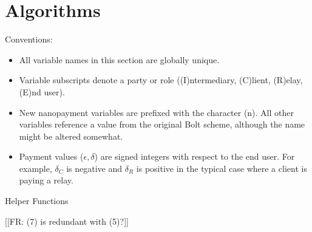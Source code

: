 \documentclass{article}
\newcommand{\flo}[1]{ {\color{blue} [[FR: #1]]}}
\begin{document}
\section{Algorithms} \label{algorithms}

Conventions:
\begin{itemize}
\item All variable names in this section are globally unique.
\item Variable subscripts denote a party or role ((I)ntermediary, (C)lient, (R)elay, (E)nd user).
\item New nanopayment variables are prefixed with the character (n). All other variables reference a value from the original Bolt scheme, although the name might be altered somewhat.
\item Payment values ($\epsilon, \delta$) are signed integers with respect to the end user. For example, $\delta_C$ is negative and $\delta_R$ is positive in the typical case where a client is paying a relay.
\end{itemize}

\begin{algorithm}
  \begin{algorithmic}[1]
    \caption{Helper Functions}
    \EndFunction{}
  \end{algorithmic}
  \flo{(7) is redundant with (5)?}
\end{algorithm}
\end{document}
